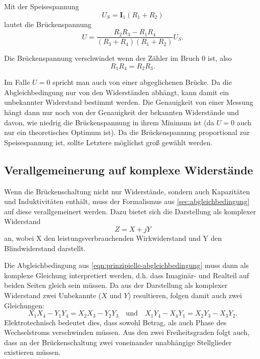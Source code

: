 Mit der Speisespannung
\begin{equation}
	U_S = \mathbf{I}_1 (R_1 + R_2)
	\label{eqn:speisespannung}
\end{equation}
lautet die Brückenspannung
\begin{equation}
	U = \frac{R_2 R_3 - R_1 R_4}{(R_3 + R_4)(R_1 + R_2)} U_S.
	\label{eqn:brueckenspannung-unabhaengig}
\end{equation}

Die Brückenspannung verschwindet wenn der Zähler im Bruch 0 ist, also
\begin{equation}
	R_1R_4 = R_2R_3.
	\label{eqn:prinzipielle-abgleichbedingung}
\end{equation}

Im Falle $U=0$ spricht man auch von einer abgeglichenen Brücke. Da die 
Abgleichbedingung nur von den Widerständen abhängt, kann damit ein unbekannter Widerstand
bestimmt werden. Die Genauigkeit von einer Messung hängt dann nur noch von der Genauigkeit
der bekannten Widerstände und davon, wie niedrig die Brückenspannung in ihrem Minimum ist
(da $U=0$ auch nur ein theoretisches Optimum ist).
Da die Brückenspannung proportional zur Speisespannung ist, sollte Letztere möglichst
groß gewählt werden.

\subsection{Verallgemeinerung auf komplexe Widerstände}
\label{sec:komplexe-widerstände}
Wenn die Brückenschaltung nicht nur Widerstände, sondern auch Kapazitäten und Induktivitäten
enthält, muss der Formalismus aus \autoref{sec:abgleichbedingung} auf diese verallgemeinert
werden. Dazu bietet sich die Darstellung als komplexer Widerstand
\begin{equation}
	Z = X + jY
	\label{eqn:komplexer-widerstand}
\end{equation}
an, wobei X den leistungsverbrauchenden Wirkwiderstand und Y den Blindwiderstand darstellt.

Die Abgleichbedingung aus \autoref{eqn:prinzipielle-abgleichbedingung} muss dann als komplexe
Gleichung interpretiert werden, d.h. dass Imaginär- und Realteil auf beiden Seiten gleich sein
müssen. Da aus der Darstellung als komplexer Widerstand zwei Unbekannte ($X$ und $Y$) resultieren,
folgen damit auch zwei Gleichungen:
\begin{equation}
	X_1X_4 - Y_1Y_4 = X_2X_3 - Y_2Y_3 
	\quad \text{und} \quad
	X_1Y_4 - X_4Y_1 = X_2Y_3 - X_3Y_2.
	\label{eqn:komplexe-abgleichbedingung}
\end{equation}
Elektrotechnisch bedeutet dies, dass sowohl Betrag, als auch Phase des Wechselstroms verschwinden
müssen. Aus den zwei Freiheitsgraden folgt auch, dass an der Brückenschaltung zwei voneinander
unabhängige Stellglieder existieren müssen.

